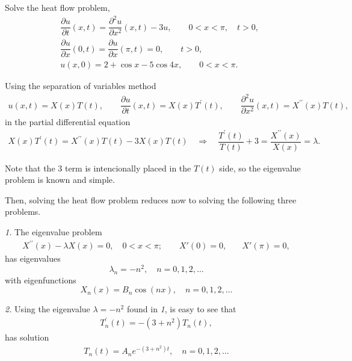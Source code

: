 \documentclass[11pt]{article}
\begin{document}
\begin{problem}
Solve the heat flow problem,
\begin{equation*} 
\begin{split}
& \dfrac{\partial u }{\partial t } (x,t) = \dfrac{\partial^2 u}{\partial x^2}(x,t) -3u, \qquad 0<x<\pi, \quad t>0, \\
& \dfrac{\partial u }{\partial x } (0,t) = \dfrac{\partial u }{\partial x } (\pi,t)=0, \qquad t>0, \\
& u(x,0) = 2 + \cos x - 5 \cos 4x, \qquad 0<x<\pi.
\end{split}
\end{equation*}
\end{problem}

\begin{solution}
Using the separation of variables method
\begin{eqnarray*}
u(x,t) = X(x)T(t), \qquad
\dfrac{\partial u }{\partial t }(x,t) = X(x)T^{\prime}(t), \qquad
\dfrac{\partial^2 u}{\partial x^2}(x,t) = X^{\prime \prime}(x)T(t),
\end{eqnarray*}
in the partial differential equation
\begin{eqnarray*}
X(x)T^{\prime}(t) = X^{\prime \prime}(x)T(t) -3X(x)T(t) \quad 
\Rightarrow \quad \dfrac{T^{\prime}(t)}{T(t)} + 3 = \dfrac{X^{\prime \prime}(x)}{X(x)} = \lambda.
\end{eqnarray*}

Note that the $3$ term is intencionally placed in the $T(t)$ side, so the eigenvalue problem is known and simple.

Then, solving the heat flow problem reduces now to solving the following three problems.

\textsl{1.} The eigenvalue problem
\begin{eqnarray*}
X^{\prime \prime}(x) - \lambda X(x)=0, \quad 0<x<\pi; \qquad
X'(0)=0, \quad & X'(\pi) =0,
\end{eqnarray*}
has eigenvalues 
$$\lambda_{n} = -n^2, \quad n = 0,1,2 , \dots$$ 
with eigenfunctions 
$$\boxed{X_{n}(x) = B_{n}\cos(n x)},\quad n = 0,1,2 , \dots$$


\textsl{2. } Using the eigenvalue $\lambda = -n^2$ found in \textsl{1}, is easy to see that 
\begin{eqnarray*}
T_{n}^{\prime}(t) = - (3+ n^{2})T_{n}(t),
\end{eqnarray*}
has solution
\begin{eqnarray*}
\boxed{T_{n}(t) = A_{n}e^{-(3+n^{2}) t}},\quad n = 0,1,2 , \dots
\end{eqnarray*}


\end{solution}
\end{document}
